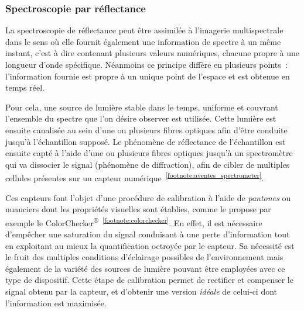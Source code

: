 \subsubsection{Spectroscopie par réflectance}
La spectroscopie de réflectance peut être assimilée à l'imagerie multispectrale dans le sens où elle fournit également une information de spectre à un même instant, c'est à dire contenant plusieurs valeurs numériques, chacune propre à une longueur d'onde spécifique. Néanmoins ce principe diffère en plusieurs points~: l'information fournie est propre à un unique point de l'espace et est obtenue en temps réel.\par

Pour cela, une source de lumière stable dans le temps, uniforme et couvrant l'ensemble du spectre que l'on désire observer est utilisée. Cette lumière est ensuite canalisée au sein d'une ou plusieurs fibres optiques afin d'être conduite jusqu'à l'échantillon supposé. Le phénomène de réflectance de l'échantillon est ensuite capté à l'aide d'une ou plusieurs fibres optiques jusqu'à un spectromètre qui va dissocier le signal (phénomène de diffraction), afin de cibler de multiples cellules présentes sur un capteur numérique~\cite{Murphy2005,Malla2008}\textsuperscript{\ref{footnote:aventes_spectrometer}}.\par

Ces capteurs font l'objet d'une procédure de calibration à l'aide de \textit{pantones} ou nuanciers dont les propriétés visuelles sont établies, comme le propose par exemple le ColorChecker\textsuperscript{®}~\textsuperscript{\ref{footnote:colorchecker}}. En effet, il est nécessaire d'empêcher une saturation du signal conduisant à une perte d'information tout en exploitant au mieux la quantification octroyée par le capteur. Sa nécessité est le fruit des multiples conditions d'éclairage possibles de l'environnement mais également de la variété des sources de lumière pouvant être employées avec ce type de dispositif. Cette étape de calibration permet de rectifier et compenser le signal obtenu par la capteur, et d'obtenir une version \textit{idéale} de celui-ci dont l'information est maximisée.\par

